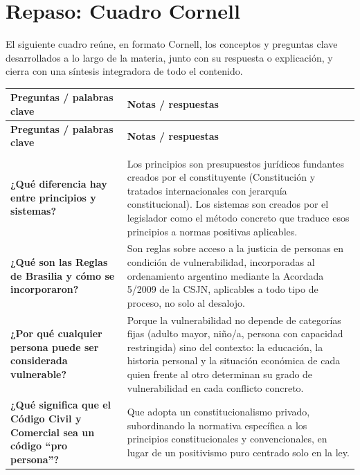 \documentclass[12pt,oneside]{book}
\begin{document}
\chapter{Repaso: Cuadro Cornell}

El siguiente cuadro reúne, en formato Cornell, los conceptos y preguntas clave desarrollados a lo largo de la materia, junto con su respuesta o explicación, y cierra con una síntesis integradora de todo el contenido.

\begin{longtable}{
    >{\raggedright\arraybackslash}p{}
    >{\raggedright\arraybackslash}p{}
}
\toprule
\textbf{Preguntas / palabras clave} & \textbf{Notas / respuestas} \\
\midrule
\endfirsthead
\toprule
\textbf{Preguntas / palabras clave} & \textbf{Notas / respuestas} \\
\midrule
\endhead
\midrule
\multicolumn{2}{r}{\textit{Continúa en la página siguiente}} \\
\endfoot
\bottomrule
\endlastfoot

\textbf{¿Qué diferencia hay entre principios y sistemas?} &
Los principios son presupuestos jurídicos fundantes creados por el constituyente (Constitución y tratados internacionales con jerarquía constitucional). Los sistemas son creados por el legislador como el método concreto que traduce esos principios a normas positivas aplicables. \\

\textbf{¿Qué son las Reglas de Brasilia y cómo se incorporaron?} &
Son reglas sobre acceso a la justicia de personas en condición de vulnerabilidad, incorporadas al ordenamiento argentino mediante la Acordada 5/2009 de la CSJN, aplicables a todo tipo de proceso, no solo al desalojo. \\

\textbf{¿Por qué cualquier persona puede ser considerada vulnerable?} &
Porque la vulnerabilidad no depende de categorías fijas (adulto mayor, niño/a, persona con capacidad restringida) sino del contexto: la educación, la historia personal y la situación económica de cada quien frente al otro determinan su grado de vulnerabilidad en cada conflicto concreto. \\

\textbf{¿Qué significa que el Código Civil y Comercial sea un código ``pro persona''?} &
Que adopta un constitucionalismo privado, subordinando la normativa específica a los principios constitucionales y convencionales, en lugar de un positivismo puro centrado solo en la ley. \\


\end{longtable}
\end{document}
